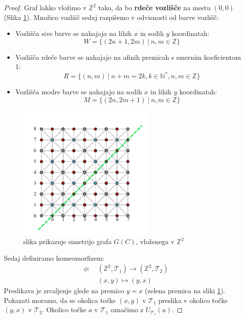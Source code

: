 \documentclass[a4paper, 12pt]{book}
\theoremstyle{definition}
\theoremstyle{remark}
\begin{document}
\begin{proof}
Graf lahko vložimo v $\mathbb{Z}^2$ tako, da bo \textbf{rdeče vozlišče} na mestu $(0,0)$ (Slika \ref{cell-graph-symetrical}).
Množico vozlišč sedaj razpišemo v odvisnosti od barve vozlišč:
\begin{itemize}
  \item Vozlišča sive barve se nahajajo na lihih $x$ in sodih $y$ koordinatah:
  \[W=\{(2n+1, 2m)\ |\ n,m \in \mathbb{Z}\}\]
  \item Vozlišča rdeče barve se nahajajo na afinih premicah s smernim koeficientom 1:
  \[R=\{(n, m)\ |\ n+m=2k,k\in \mathbb{N}^*,n,m \in \mathbb{Z}\}\]
  \item Vozlišča modre barve se nahajajo na sodih $x$ in lihih $y$ koordinatah:
  \[M=\{(2n, 2m+1)\ |\ n,m \in \mathbb{Z}\}\]
\end{itemize}
\begin{figure}[h]
  \begin{center}
  \includegraphics[width=0.6\textwidth]{r2-cell-graph-symetrical.pdf}
  \end{center}
  \caption{slika prikazuje simetrijo grafa $G(C)$, vloženega v $\mathbb{Z}^2$}
  \label{cell-graph-symetrical}
\end{figure}
Sedaj definiramo homeomorfizem:
\begin{align*}
    \phi:\ &(\mathbb{Z}^2,\mathcal{T}_1) \rightarrow (\mathbb{Z}^2,\mathcal{T}_2)\\
    &(x,y) \mapsto (y, x)
\end{align*}
Preslikava je zrcaljenje glede na premico $y=x$ (zelena premica na sliki \ref{cell-graph-symetrical}).
Pokazati moramo, da se okolica točke $(x,y)$ v $\mathcal{T}_1$ preslika v okolico točke $(y,x)$ v $\mathcal{T}_2$.
Okolico točke $a$ v $\mathcal{T}_1$ označimo z $U_{\mathcal{T}_1}(a)$.

\end{proof}
\end{document}
